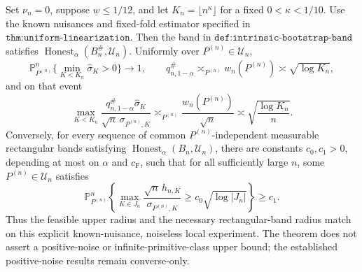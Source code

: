 Set \(\nu_n=0\), suppose \(\underline w\leq1/12\), and let \(K_n=\lfloor n^\kappa\rfloor\) for a fixed \(0<\kappa<1/10\).  Use the known nuisances and fixed-fold estimator specified in \(\texttt{thm:uniform-linearization}\).  Then the band in \(\texttt{def:intrinsic-bootstrap-band}\) satisfies \(\operatorname{Honest}_{\alpha}(B_n^{\#},\mathcal U_n)\).  Uniformly over \(P^{(n)}\in\mathcal U_n\),
\[
 \mathbb P_{P^{(n)}}^n\{\min_{K<K_n}\widehat\sigma_K>0\}\longrightarrow1,
 \qquad
 q_{n,1-\alpha}^{\#}\asymp_{P^{(n)}}w_n(P^{(n)})\asymp\sqrt{\log K_n},
\]
and on that event
\[
 \max_{K<K_n}\frac{q_{n,1-\alpha}^{\#}\widehat\sigma_K}{\sqrt n\,\sigma_{P^{(n)},K}}
 \asymp_{P^{(n)}}\frac{w_n(P^{(n)})}{\sqrt n}
 \asymp\sqrt{\frac{\log K_n}{n}}.
\]
Conversely, for every sequence of common \(P^{(n)}\)-independent measurable rectangular bands satisfying \(\operatorname{Honest}_{\alpha}(B_n,\mathcal U_n)\), there are constants \(c_0,c_1>0\), depending at most on \(\alpha\) and \(c_{\mathrm F}\), such that for all sufficiently large \(n\), some \(P^{(n)}\in\mathcal U_n\) satisfies
\[
 \mathbb P_{P^{(n)}}^n\left\{\max_{K\in J_n}
 \frac{\sqrt n\,h_{n,K}}{\sigma_{P^{(n)},K}}
 \geq c_0\sqrt{\log|J_n|}\right\}\geq c_1.
\]
Thus the feasible upper radius and the necessary rectangular-band radius match on this explicit known-nuisance, noiseless local experiment.  The theorem does not assert a positive-noise or infinite-primitive-class upper bound; the established positive-noise results remain converse-only.